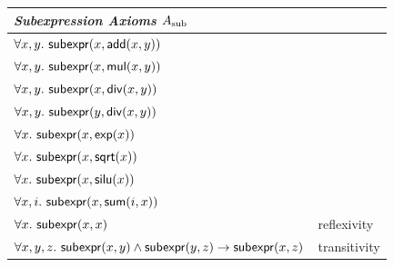 \begin{table}[h]
{\begin{tabular}{l|l}
    \midrule
    \multicolumn{2}{l}{\it Subexpression Axioms $A_\text{sub}$} \\
    \midrule
    $\forall x,y.\ \subexpr(x, \eadd(x, y))$ & \\
    $\forall x,y.\ \subexpr(x, \emul(x, y))$ & \\
    $\forall x,y.\ \subexpr(x, \ediv(x, y))$ & \\
    $\forall x,y.\ \subexpr(y, \ediv(x, y))$ & \\
    $\forall x.\ \subexpr(x, \eexp(x))$ & \\
    $\forall x.\ \subexpr(x, \esqrt(x))$ & \\
    $\forall x.\ \subexpr(x, \esilu(x))$ & \\
    $\forall x,i.\ \subexpr(x, \ered(i, x))$ & \\
    $\forall x.\ \subexpr(x, x)$ & reflexivity \\
    $\forall x,y,z.\ \subexpr(x,y) \wedge \subexpr(y,z) \to \subexpr(x, z)$ & transitivity \\
    \bottomrule
    \end{tabular}
    }
    \vspace{\captionvspace}
\end{table}


